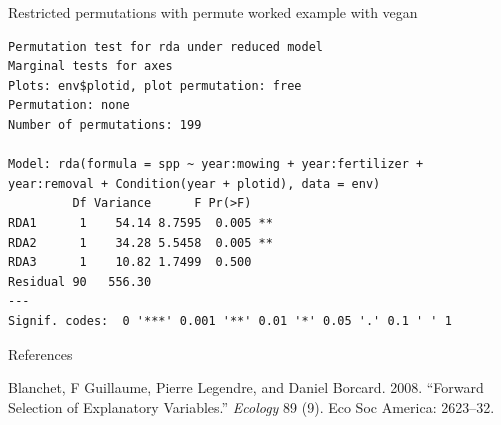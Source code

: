 \documentclass[10pt,ignorenonframetext,compress, aspectratio=169]{beamer}
\begin{document}
\begin{frame}[fragile]{Restricted permutations with permute \textbar{}
worked example with vegan}
\begin{verbatim}
Permutation test for rda under reduced model
Marginal tests for axes
Plots: env$plotid, plot permutation: free
Permutation: none
Number of permutations: 199

Model: rda(formula = spp ~ year:mowing + year:fertilizer + year:removal + Condition(year + plotid), data = env)
         Df Variance      F Pr(>F)   
RDA1      1    54.14 8.7595  0.005 **
RDA2      1    34.28 5.5458  0.005 **
RDA3      1    10.82 1.7499  0.500   
Residual 90   556.30                 
---
Signif. codes:  0 '***' 0.001 '**' 0.01 '*' 0.05 '.' 0.1 ' ' 1
\end{verbatim}

\normalsize

\end{frame}

\begin{frame}{References}

Blanchet, F Guillaume, Pierre Legendre, and Daniel Borcard. 2008.
``Forward Selection of Explanatory Variables.'' \emph{Ecology} 89 (9).
Eco Soc America: 2623--32.

\end{frame}
\end{document}
